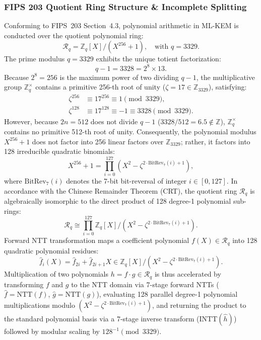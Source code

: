 \subsubsection{FIPS 203 Quotient Ring Structure \& Incomplete Splitting}
Conforming to FIPS~203 Section~4.3, polynomial arithmetic in \mbox{ML-KEM} is conducted over the quotient polynomial ring:
\begin{equation}
\label{eq:rq_ring_def}
\mathcal{R}_q = \mathbb{Z}_q[X]/(X^{256} + 1), \quad \text{with } q = 3329.
\end{equation}
The prime modulus $q = 3329$ exhibits the unique totient factorization:
\begin{equation}
\label{eq:q_totient}
q - 1 = 3328 = 2^8 \times 13.
\end{equation}
Because $2^8 = 256$ is the maximum power of two dividing $q - 1$, the multiplicative group $\mathbb{Z}_q^\times$ contains a primitive 256-th root of unity ($\zeta = 17 \in \mathbb{Z}_{3329}$), satisfying:
\begin{align}
\label{eq:primitive_zeta}
\zeta^{256} &\equiv 17^{256} \equiv 1 \pmod{3329}, \\
\zeta^{128} &\equiv 17^{128} \equiv -1 \equiv 3328 \pmod{3329}.
\end{align}
However, because $2n = 512$ does not divide $q - 1$ ($3328 / 512 = 6.5 \notin \mathbb{Z}$), $\mathbb{Z}_q^\times$ contains no primitive 512-th root of unity. Consequently, the polynomial modulus $X^{256} + 1$ does not factor into 256 linear factors over $\mathbb{Z}_{3329}$; rather, it factors into 128 irreducible quadratic binomials:
\begin{equation}
\label{eq:crt_splitting}
X^{256} + 1 = \prod_{i=0}^{127} \left(X^2 - \zeta^{2 \cdot \text{BitRev}_7(i) + 1}\right),
\end{equation}
where $\text{BitRev}_7(i)$ denotes the 7-bit bit-reversal of integer $i \in [0, 127]$. In accordance with the Chinese Remainder Theorem (CRT), the quotient ring $\mathcal{R}_q$ is algebraically isomorphic to the direct product of 128 degree-1 polynomial sub-rings:
\begin{equation}
\label{eq:crt_isomorphism_ntt}
\mathcal{R}_q \cong \prod_{i=0}^{127} \mathbb{Z}_q[X] / \left(X^2 - \zeta^{2 \cdot \text{BitRev}_7(i) + 1}\right).
\end{equation}
Forward NTT transformation maps a coefficient polynomial $f(X) \in \mathcal{R}_q$ into 128 quadratic polynomial residues:
\begin{equation}
\label{eq:ntt_poly_pair}
\hat{f}_i(X) = \hat{f}_{2i} + \hat{f}_{2i+1} X \in \mathbb{Z}_q[X]/(X^2 - \zeta^{2\cdot\text{BitRev}_7(i)+1}).
\end{equation}
Multiplication of two polynomials $h = f \cdot g \in \mathcal{R}_q$ is thus accelerated by transforming $f$ and $g$ to the NTT domain via 7-stage forward NTTs ($\hat{f} = \text{NTT}(f)$, $\hat{g} = \text{NTT}(g)$), evaluating 128 parallel degree-1 polynomial multiplications modulo $(X^2 - \zeta^{2\cdot\text{BitRev}_7(i)+1})$, and returning the product to the standard polynomial basis via a 7-stage inverse transform ($\text{INTT}(\hat{h})$) followed by modular scaling by $128^{-1} \pmod{3329}$.

